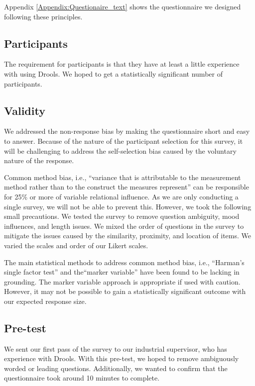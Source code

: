 Appendix \ref{Appendix:Questionaire_text} shows the questionnaire we designed following these principles.


\subsection{Participants}

The requirement for participants is that they have at least a little experience with using Drools.
We hoped to get a statistically significant number of participants.

\subsection{Validity}
We addressed the non-response bias\cite{armstrong1977estimating} by making the questionnaire short and easy to answer.
Because of the nature of the participant selection for this survey, it will be challenging to address the self-selection bias caused by the voluntary nature of the response.

Common method bias, i.e., ``variance that is attributable to the measurement method rather than to the construct the measures represent''\cite{podsakoff2003common} can be responsible for 25\% or more of variable relational influence.
As we are only conducting a single survey, we will not be able to prevent this. 
However, we took the following small precautions.
We tested the survey to remove question ambiguity, mood influences, and length issues.
We mixed the order of questions in the survey to mitigate the issues caused by the similarity, proximity, and location of items.
We varied the scales and order of our Likert scales.

The main statistical methods to address common method bias, i.e., ``Harman's single factor test''\cite{podsakoff2003common} and the``marker variable''\cite{lindell2001accounting} have been found to be lacking in grounding\cite{gorrell2011countering}.
The marker variable approach is appropriate if used with caution.
However, it may not be possible to gain a statistically significant outcome with our expected response size.

\subsection{Pre-test}
We sent our first pass of the survey to our industrial supervisor, who has experience with Drools.
With this pre-test, we hoped to remove ambiguously worded or leading questions.
Additionally, we wanted to confirm that the questionnaire took around 10 minutes to complete.

